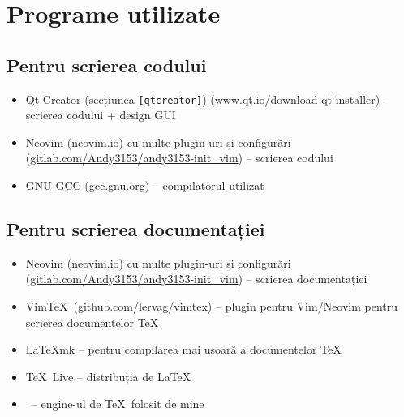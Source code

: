 \section{Programe utilizate}
\subsection{Pentru scrierea codului}
\begin{itemize}
 \item Qt Creator (secțiunea \texttt{\ref{qtcreator}}) (\url{www.qt.io/download-qt-installer}) -- scrierea codului + design GUI
 \item Neovim (\url{neovim.io}) cu multe plugin-uri și configurări (\url{gitlab.com/Andy3153/andy3153-init_vim}) -- scrierea codului
 \item GNU GCC (\url{gcc.gnu.org}) -- compilatorul utilizat
\end{itemize}

\subsection{Pentru scrierea documentației}
\begin{itemize}
 \item Neovim (\url{neovim.io}) cu multe plugin-uri și configurări (\url{gitlab.com/Andy3153/andy3153-init_vim}) -- scrierea documentației
 \item Vim\TeX\ (\url{github.com/lervag/vimtex}) -- plugin pentru Vim/Neovim pentru scrierea documentelor \TeX
 \item \LaTeX mk -- pentru compilarea mai ușoară a documentelor \TeX
 \item \TeX\ Live -- distribuția de \LaTeX
 \item \XeLaTeX\ -- engine-ul de \TeX\ folosit de mine
\end{itemize}
